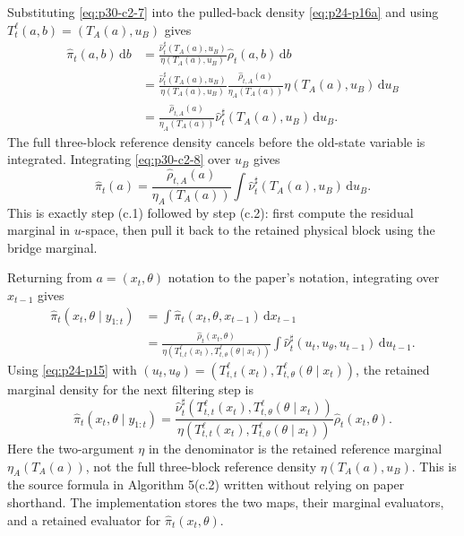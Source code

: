 \documentclass[11pt]{article}
\numberwithin{equation}{section}
\newcommand{\dd}{\,\mathrm d}
\begin{document}
Substituting \eqref{eq:p30-c2-7} into the pulled-back density \eqref{eq:p24-p16a}
and using \(T_t^\ell(a,b)=(T_A(a),u_B)\) gives
\begin{equation}
\begin{aligned}
    \widehat\pi_t(a,b)\dd b
    &=
    \frac{\widehat\nu_t^\sharp(T_A(a),u_B)}
    {\eta(T_A(a),u_B)}
    \widehat\rho_t(a,b)\dd b\\
    &=
    \frac{\widehat\nu_t^\sharp(T_A(a),u_B)}
    {\eta(T_A(a),u_B)}
    \frac{\widehat\rho_{t,A}(a)}
    {\eta_A(T_A(a))}
    \eta(T_A(a),u_B)\dd u_B\\
    &=
    \frac{\widehat\rho_{t,A}(a)}
    {\eta_A(T_A(a))}
    \widehat\nu_t^\sharp(T_A(a),u_B)\dd u_B.
\end{aligned}
    \label{eq:p30-c2-8}
\end{equation}
The full three-block reference density cancels before the old-state variable
is integrated.  Integrating \eqref{eq:p30-c2-8} over \(u_B\) gives
\begin{equation}
    \widehat\pi_t(a)
    =
    \frac{\widehat\rho_{t,A}(a)}
    {\eta_A(T_A(a))}
    \int\widehat\nu_t^\sharp(T_A(a),u_B)\dd u_B.
    \label{eq:p30-c2-9}
\end{equation}
This is exactly step (c.1) followed by step (c.2): first compute the residual
marginal in \(u\)-space, then pull it back to the retained physical block using
the bridge marginal.

Returning from \(a=(x_t,\theta)\) notation to the paper's notation, integrating
over \(x_{t-1}\) gives
\begin{equation}
\begin{aligned}
 \widehat\pi_t(x_t,\theta\mid y_{1:t})
 &=
 \int \widehat\pi_t(x_t,\theta,x_{t-1})\dd x_{t-1}\\
 &=
 \frac{\widehat\rho_t(x_t,\theta)}
 {\eta(T_{t,t}^{\ell}(x_t),T_{t,\theta}^{\ell}(\theta\mid x_t))}
 \int \widehat\nu_t^\sharp(u_t,u_\theta,u_{t-1})\dd u_{t-1}.
\end{aligned}
    \label{eq:p24-p16d}
\end{equation}
Using \eqref{eq:p24-p15} with
\((u_t,u_\theta)=
(T_{t,t}^{\ell}(x_t),T_{t,\theta}^{\ell}(\theta\mid x_t))\), the retained
marginal density for the next filtering step is
\begin{equation}
    \widehat\pi_t(x_t,\theta\mid y_{1:t})
    =
    \frac{
    \widehat\nu_t^\sharp\!\left(
    T_{t,t}^{\ell}(x_t),
    T_{t,\theta}^{\ell}(\theta\mid x_t)
    \right)}
    {
    \eta\!\left(
    T_{t,t}^{\ell}(x_t),
    T_{t,\theta}^{\ell}(\theta\mid x_t)
    \right)}
    \widehat\rho_t(x_t,\theta).
    \label{eq:p24-p17}
\end{equation}
Here the two-argument \(\eta\) in the denominator is the retained reference
marginal \(\eta_A(T_A(a))\), not the full three-block reference density
\(\eta(T_A(a),u_B)\).  This is the source formula in Algorithm 5(c.2) written
without relying on paper shorthand.  The implementation stores the two maps, their marginal
evaluators, and a retained evaluator for \(\widehat\pi_t(x_t,\theta)\).
\end{document}
